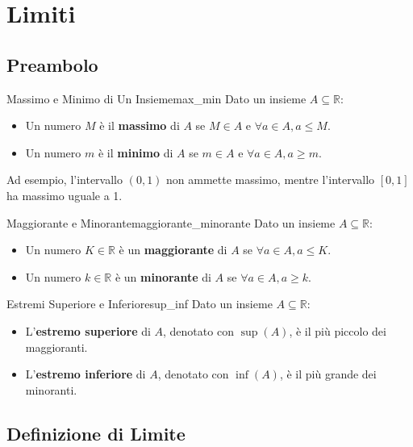 \section{Limiti}

\subsection{Preambolo}

\begin{definition}{Massimo e Minimo di Un Insieme}{max_min}
    Dato un insieme $A \subseteq \mathbb{R}$:
    \begin{itemize}
        \item Un numero $M$ è il \textbf{massimo} di $A$ se $M \in A$ e $\forall a \in A, a \le M$.
        \item Un numero $m$ è il \textbf{minimo} di $A$ se $m \in A$ e $\forall a \in A, a \ge m$.
    \end{itemize}
\end{definition}

Ad esempio, l'intervallo $(0,1)$ non ammette massimo, mentre l'intervallo $[0,1]$ ha massimo uguale a 1.

\begin{definition}{Maggiorante e Minorante}{maggiorante_minorante}
    Dato un insieme $A \subseteq \mathbb{R}$:
    \begin{itemize}
        \item Un numero $K \in \mathbb{R}$ è un \textbf{maggiorante} di $A$ se $\forall a \in A, a \le K$.
        \item Un numero $k \in \mathbb{R}$ è un \textbf{minorante} di $A$ se $\forall a \in A, a \ge k$.
    \end{itemize}
\end{definition}

\begin{definition}{Estremi Superiore e Inferiore}{sup_inf}
    Dato un insieme $A \subseteq \mathbb{R}$:
    \begin{itemize}
        \item L'\textbf{estremo superiore} di $A$, denotato con $\sup(A)$, è il più piccolo dei maggioranti.
        \item L'\textbf{estremo inferiore} di $A$, denotato con $\inf(A)$, è il più grande dei minoranti.
    \end{itemize}
\end{definition}

\subsection{Definizione di Limite}

